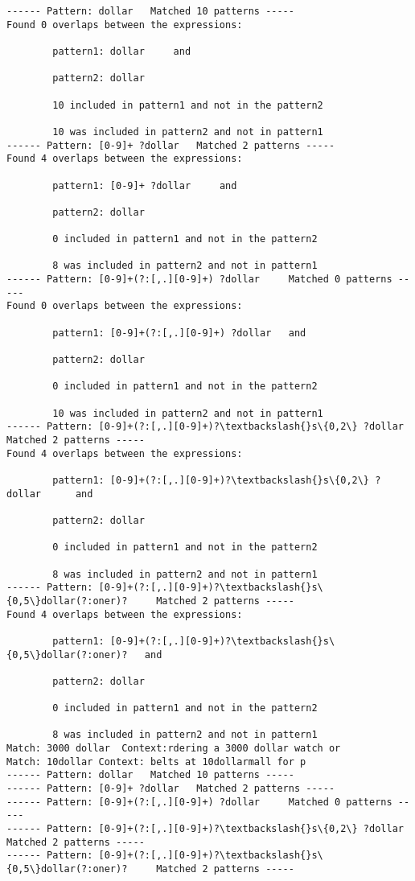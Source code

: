 \documentclass[11pt]{article}
\begin{document}
    \begin{Verbatim}[commandchars=\\\{\}]
------ Pattern: dollar	 Matched 10 patterns -----
Found 0 overlaps between the expressions:

        pattern1: dollar 	 and

        pattern2: dollar

        10 included in pattern1 and not in the pattern2

        10 was included in pattern2 and not in pattern1
------ Pattern: [0-9]+ ?dollar	 Matched 2 patterns -----
Found 4 overlaps between the expressions:

        pattern1: [0-9]+ ?dollar 	 and

        pattern2: dollar

        0 included in pattern1 and not in the pattern2

        8 was included in pattern2 and not in pattern1
------ Pattern: [0-9]+(?:[,.][0-9]+) ?dollar	 Matched 0 patterns -----
Found 0 overlaps between the expressions:

        pattern1: [0-9]+(?:[,.][0-9]+) ?dollar 	 and

        pattern2: dollar

        0 included in pattern1 and not in the pattern2

        10 was included in pattern2 and not in pattern1
------ Pattern: [0-9]+(?:[,.][0-9]+)?\textbackslash{}s\{0,2\} ?dollar	 Matched 2 patterns -----
Found 4 overlaps between the expressions:

        pattern1: [0-9]+(?:[,.][0-9]+)?\textbackslash{}s\{0,2\} ?dollar 	 and

        pattern2: dollar

        0 included in pattern1 and not in the pattern2

        8 was included in pattern2 and not in pattern1
------ Pattern: [0-9]+(?:[,.][0-9]+)?\textbackslash{}s\{0,5\}dollar(?:oner)?	 Matched 2 patterns -----
Found 4 overlaps between the expressions:

        pattern1: [0-9]+(?:[,.][0-9]+)?\textbackslash{}s\{0,5\}dollar(?:oner)? 	 and

        pattern2: dollar

        0 included in pattern1 and not in the pattern2

        8 was included in pattern2 and not in pattern1
Match: 3000 dollar	Context:rdering a 3000 dollar watch or 
Match: 10dollar	Context: belts at 10dollarmall for p
------ Pattern: dollar	 Matched 10 patterns -----
------ Pattern: [0-9]+ ?dollar	 Matched 2 patterns -----
------ Pattern: [0-9]+(?:[,.][0-9]+) ?dollar	 Matched 0 patterns -----
------ Pattern: [0-9]+(?:[,.][0-9]+)?\textbackslash{}s\{0,2\} ?dollar	 Matched 2 patterns -----
------ Pattern: [0-9]+(?:[,.][0-9]+)?\textbackslash{}s\{0,5\}dollar(?:oner)?	 Matched 2 patterns -----

    \end{Verbatim}
\end{document}
